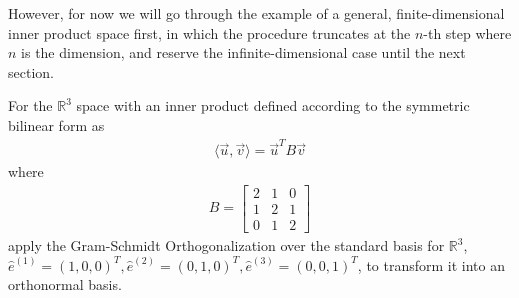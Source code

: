 However, for now we will go through the example of a general, finite-dimensional inner product space first, in which the procedure truncates at the $n$-th step where $n$ is the dimension, and reserve the infinite-dimensional case until the next section.
\begin{exmp}
\label{exmp:R3innerGS}
For the $\mathbb{R}^3$ space with an inner product defined according to the symmetric bilinear form as
\begin{align*}
\langle \vec{u}, \vec{v} \rangle = \vec{u}^TB\vec{v}
\end{align*}
where 
\begin{align*}
B =
\begin{bmatrix}
2&1&0\\ 
1&2&1\\
0&1&2
\end{bmatrix}
\end{align*}
apply the Gram-Schmidt Orthogonalization over the standard basis for $\mathbb{R}^3$, $\hat{e}^{(1)} = (1,0,0)^T, \hat{e}^{(2)} = (0,1,0)^T, \hat{e}^{(3)} = (0,0,1)^T$, to transform it into an orthonormal basis.
\end{exmp}
